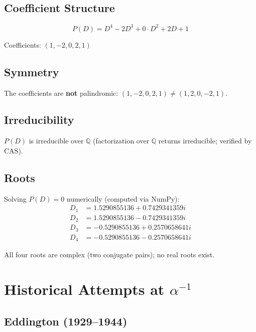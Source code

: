 \documentclass[11pt,a4paper]{article}
\begin{document}
\subsection{Coefficient Structure}

\begin{equation}
P(D) = D^4 - 2D^3 + 0 \cdot D^2 + 2D + 1
\end{equation}

Coefficients: $(1, -2, 0, 2, 1)$

\subsection{Symmetry}

The coefficients are \textbf{not} palindromic: $(1, -2, 0, 2, 1) \neq (1, 2, 0, -2, 1)$.

\subsection{Irreducibility}

$P(D)$ is irreducible over $\mathbb{Q}$ (factorization over $\mathbb{Q}$ returns irreducible; verified by CAS).

\subsection{Roots}

Solving $P(D) = 0$ numerically (computed via NumPy):
\begin{align}
D_1 &= 1.5290855136 + 0.7429341359i \\
D_2 &= 1.5290855136 - 0.7429341359i \\
D_3 &= -0.5290855136 + 0.2570658641i \\
D_4 &= -0.5290855136 - 0.2570658641i
\end{align}

All four roots are complex (two conjugate pairs); no real roots exist.

\section{Historical Attempts at $\alpha^{-1}$}

\subsection{Eddington (1929--1944)}
\end{document}
